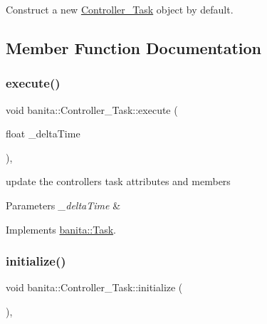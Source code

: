 Construct a new \mbox{\hyperlink{classbanita_1_1_controller___task}{Controller\+\_\+\+Task}} object by default. 



\subsection{Member Function Documentation}
\mbox{\label{classbanita_1_1_controller___task_a7391e5e47d43ac832fdff9912e140815}} 
\subsubsection{\texorpdfstring{execute()}{execute()}}
{\footnotesize\ttfamily void banita\+::\+Controller\+\_\+\+Task\+::execute (\begin{DoxyParamCaption}\item[{float}]{\+\_\+delta\+Time }\end{DoxyParamCaption})\hspace{0.3cm}{\ttfamily [override]}, {\ttfamily [virtual]}}



update the controller\textquotesingle{}s task attributes and members 


\begin{DoxyParams}{Parameters}
{\em \+\_\+delta\+Time} & \\
\hline
\end{DoxyParams}


Implements \mbox{\hyperlink{classbanita_1_1_task_aa79a45c9cbfac80ec9e4f060d5d444aa}{banita\+::\+Task}}.

\mbox{\label{classbanita_1_1_controller___task_a87990651d658eb3d26a9b8526e600fd7}} 
\subsubsection{\texorpdfstring{initialize()}{initialize()}}
{\footnotesize\ttfamily void banita\+::\+Controller\+\_\+\+Task\+::initialize (\begin{DoxyParamCaption}{ }\end{DoxyParamCaption})\hspace{0.3cm}{\ttfamily [override]}, {\ttfamily [virtual]}}



